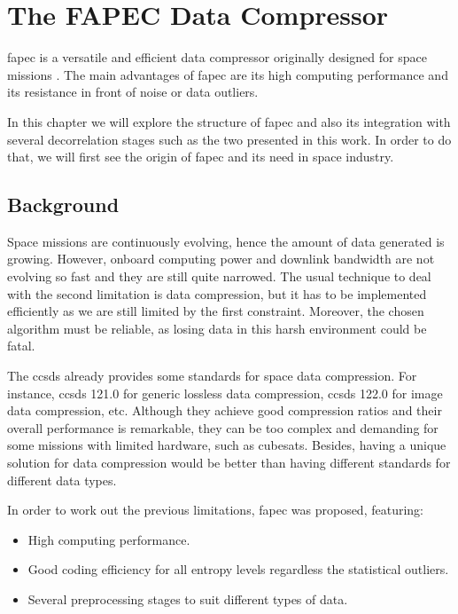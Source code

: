 \chapter{The FAPEC Data Compressor}

\acrfull{fapec} is a versatile and efficient data compressor originally designed for space missions \parencite{PaperFAPEC}. The main advantages of \acrshort{fapec} are its high computing performance and its resistance in front of noise or data outliers.

In this chapter we will explore the structure of \acrshort{fapec} and also its integration with several decorrelation stages such as the two presented in this work. In order to do that, we will first see the origin of \acrshort{fapec} and its need in space industry.

\section{Background}
Space missions are continuously evolving, hence the amount of data generated is growing. However, onboard computing power and downlink bandwidth are not evolving so fast and they are still quite narrowed. The usual technique to deal with the second limitation is data compression, but it has to be implemented efficiently as we are still limited by the first constraint. Moreover, the chosen algorithm must be reliable, as losing data in this harsh environment could be fatal.

The \acrfull{ccsds} already provides some standards for space data compression. For instance, \acrshort{ccsds} 121.0 for generic lossless data compression, \acrshort{ccsds} 122.0 \parencite{ccsds122} for image data compression, etc. Although they achieve good compression ratios and their overall performance is remarkable, they can be too complex and demanding for some missions with limited hardware, such as cubesats. Besides, having a unique solution for data compression would be better than having different standards for different data types.

In order to work out the previous limitations, \acrshort{fapec} was proposed, featuring:
\begin{itemize}
	\item High computing performance.
	\item Good coding efficiency for all entropy levels regardless the statistical outliers.
	\item Several preprocessing stages to suit different types of data.
\end{itemize}

